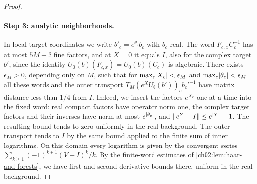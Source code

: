 \begin{proof}
\paragraph{Step 3: analytic neighborhoods.}
In local target coordinates we write $b'_c=e^{\theta_c}b_c$ with $b_c$ real. The word $F_{c,x}C_c^{-1}$ has at most $5M-3$ fine factors, and at $X=0$ it equals $I$, also for the complex target $b'$, since the identity $U_0(b)(F_{c,x})=U_0(b)(C_c)$ is algebraic. There exists $\epsilon_M>0$, depending only on $M$, such that for $\max_e\lvert X_e\rvert<\epsilon_M$ and $\max_c\lvert \theta_c\rvert<\epsilon_M$ all these words and the outer transport $T_M(e^XU_0(b'))_cb_c'^{-1}$ have matrix distance less than $1/4$ from $I$. Indeed, we insert the factors $e^{X_e}$ one at a time into the fixed word: real compact factors have operator norm one, the complex target factors and their inverses have norm at most $e^{\lvert \theta_c\rvert}$, and $\lVert e^Y-I\rVert\le e^{\lvert Y\rvert}-1$. The resulting bound tends to zero uniformly in the real background. The outer transport tends to $I$ by the same bound applied to the finite sum of inner logarithms. On this domain every logarithm is given by the convergent series $\sum_{k\ge1}(-1)^{k+1}(V-I)^k/k$. By the finite-word estimates of \cref{ch02:lem:haar-and-forests}, we have first and second derivative bounds there, uniform in the real background.


\end{proof}
